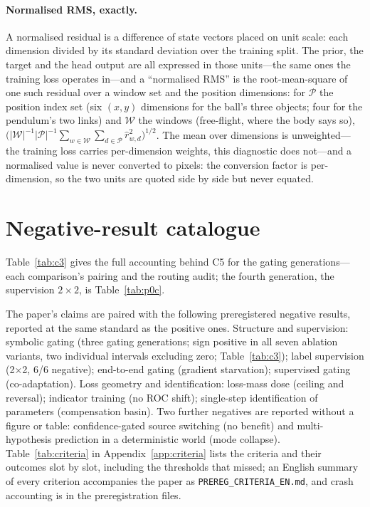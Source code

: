 \documentclass{article}
\begin{document}
\paragraph{Normalised RMS, exactly.} A normalised residual is a difference of state vectors placed on unit scale: each dimension divided by its standard deviation over the training split. The prior, the target and the head output are all expressed in those units---the same ones the training loss operates in---and a ``normalised RMS'' is the root-mean-square of one such residual over a window set and the position dimensions: for $\mathcal{P}$ the position index set (six $(x,y)$ dimensions for the ball's three objects; four for the pendulum's two links) and $\mathcal{W}$ the windows (free-flight, where the body says so), $\bigl(|\mathcal{W}|^{-1}|\mathcal{P}|^{-1}\sum_{w\in\mathcal{W}}\sum_{d\in\mathcal{P}}\hat r_{w,d}^{2}\bigr)^{1/2}$. The mean over dimensions is unweighted---the training loss carries per-dimension weights, this diagnostic does not---and a normalised value is never converted to pixels: the conversion factor is per-dimension, so the two units are quoted side by side but never equated.

\section{Negative-result catalogue}\label{app:negative}
Table~\ref{tab:c3} gives the full accounting behind C5 for the gating generations---each comparison's pairing and the routing audit; the fourth generation, the supervision $2\times2$, is Table~\ref{tab:p0c}.


The paper's claims are paired with the following preregistered negative results, reported at the same standard as the positive ones. Structure and supervision: symbolic gating (three gating generations; sign positive in all seven ablation variants, two individual intervals excluding zero; Table~\ref{tab:c3}); label supervision (2$\times$2, 6/6 negative); end-to-end gating (gradient starvation); supervised gating (co-adaptation). Loss geometry and identification: loss-mass dose (ceiling and reversal); indicator training (no ROC shift); single-step identification of parameters (compensation basin). Two further negatives are reported without a figure or table: confidence-gated source switching (no benefit) and multi-hypothesis prediction in a deterministic world (mode collapse). Table~\ref{tab:criteria} in Appendix~\ref{app:criteria} lists the criteria and their outcomes slot by slot, including the thresholds that missed; an English summary of every criterion accompanies the paper as \texttt{PREREG\_CRITERIA\_EN.md}, and crash accounting is in the preregistration files.
\end{document}

